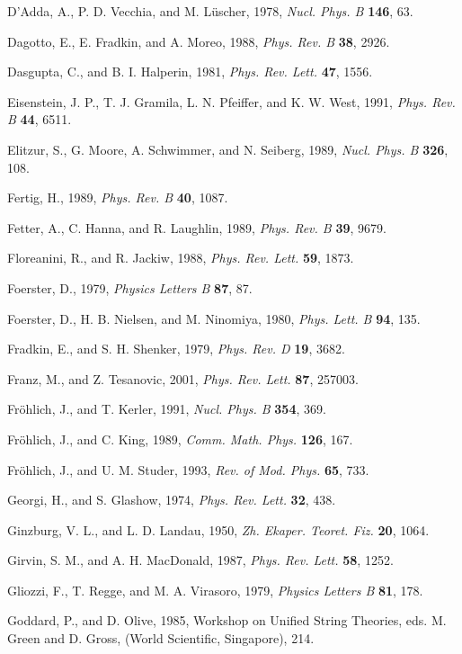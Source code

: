 \begin{list}{}{\setlength{\leftmargin}{2em}\setlength{\itemindent}{-2em}}
\item D'Adda, A., P. D. Vecchia, and M. L\"{u}scher, 1978, \emph{Nucl. Phys. B} \textbf{146}, 63.
\item Dagotto, E., E. Fradkin, and A. Moreo, 1988, \emph{Phys. Rev. B} \textbf{38}, 2926.
\item Dasgupta, C., and B. I. Halperin, 1981, \emph{Phys. Rev. Lett.} \textbf{47}, 1556.
\item Eisenstein, J. P., T. J. Gramila, L. N. Pfeiffer, and K. W. West, 1991, \emph{Phys. Rev. B} \textbf{44}, 6511.
\item Elitzur, S., G. Moore, A. Schwimmer, and N. Seiberg, 1989, \emph{Nucl. Phys. B} \textbf{326}, 108.
\item Fertig, H., 1989, \emph{Phys. Rev. B} \textbf{40}, 1087.
\item Fetter, A., C. Hanna, and R. Laughlin, 1989, \emph{Phys. Rev. B} \textbf{39}, 9679.
\item Floreanini, R., and R. Jackiw, 1988, \emph{Phys. Rev. Lett.} \textbf{59}, 1873.
\item Foerster, D., 1979, \emph{Physics Letters B} \textbf{87}, 87.
\item Foerster, D., H. B. Nielsen, and M. Ninomiya, 1980, \emph{Phys. Lett. B} \textbf{94}, 135.
\item Fradkin, E., and S. H. Shenker, 1979, \emph{Phys. Rev. D} \textbf{19}, 3682.
\item Franz, M., and Z. Tesanovic, 2001, \emph{Phys. Rev. Lett.} \textbf{87}, 257003.
\item Fr\"{o}hlich, J., and T. Kerler, 1991, \emph{Nucl. Phys. B} \textbf{354}, 369.
\item Fr\"{o}hlich, J., and C. King, 1989, \emph{Comm. Math. Phys.} \textbf{126}, 167.
\item Fr\"{o}hlich, J., and U. M. Studer, 1993, \emph{Rev. of Mod. Phys.} \textbf{65}, 733.
\item Georgi, H., and S. Glashow, 1974, \emph{Phys. Rev. Lett.} \textbf{32}, 438.
\item Ginzburg, V. L., and L. D. Landau, 1950, \emph{Zh. Ekaper. Teoret. Fiz.} \textbf{20}, 1064.
\item Girvin, S. M., and A. H. MacDonald, 1987, \emph{Phys. Rev. Lett.} \textbf{58}, 1252.
\item Gliozzi, F., T. Regge, and M. A. Virasoro, 1979, \emph{Physics Letters B} \textbf{81}, 178.
\item Goddard, P., and D. Olive, 1985, Workshop on Unified String Theories, eds. M. Green and D. Gross, (World Scientific, Singapore), 214.

\end{list}

